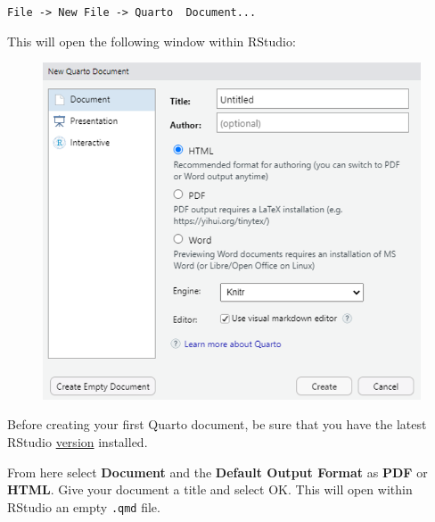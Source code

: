 \documentclass[
  letterpaper,
  DIV=11,
  numbers=noendperiod]{scrartcl}
\begin{document}
\texttt{File\ -\textgreater{}\ New\ File\ -\textgreater{}\ Quarto\ \ Document...}

This will open the following window within RStudio:

\begin{figure}

{\centering \includegraphics[width=5.20833in,height=\textheight]{images/quarto1.png}

}

\end{figure}

\begin{tcolorbox}[enhanced jigsaw, colback=white, toprule=.15mm, arc=.35mm, colbacktitle=quarto-callout-important-color!10!white, titlerule=0mm, colframe=quarto-callout-important-color-frame, title=\textcolor{quarto-callout-important-color}{\faExclamation}\hspace{0.5em}{Important}, bottomtitle=1mm, toptitle=1mm, coltitle=black, rightrule=.15mm, opacityback=0, bottomrule=.15mm, breakable, leftrule=.75mm, left=2mm, opacitybacktitle=0.6]

Before creating your first Quarto document, be sure that you have the
latest RStudio
\href{https://posit.co/download/rstudio-desktop/}{version} installed.

\end{tcolorbox}

From here select \textbf{Document} and the \textbf{Default Output
Format} as \textbf{PDF} or \textbf{HTML}. Give your document a title and
select OK. This will open within RStudio an empty \texttt{.qmd} file.
\end{document}
